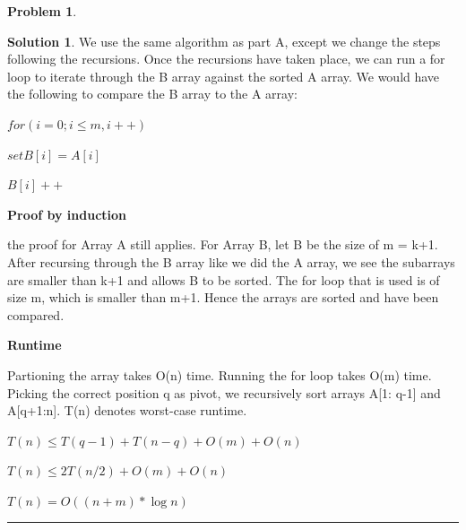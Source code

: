 \documentclass{article}
\theoremstyle{definition}
\newtheorem{problem}{Problem}
\def\fline{\rule{0.75\linewidth}{0.5pt}}
\newcommand{\finishline}{\begin{center}\fline\end{center}}
\newtheorem*{solution*}{Solution}
\newenvironment{solution}{\begin{solution*}}{{\finishline} \end{solution*}}
\begin{document}
\begin{problem}
\begin{enumerate}
    
    		    \begin{solution}
	\item We use the same algorithm as part A, except we change the steps following the recursions. Once the recursions have taken place, we can run a for loop to iterate through the B array against the sorted A array. We would have the following to compare the B array to the A array:
	\item $for (i = 0; i \leq m, i++) $
	\item \quad $set B[i] = A[i] $
	\item \quad $B[i]++$

	\item \textbf{Proof by induction}
	\item the proof for Array A still applies. For Array B, let B be the size of m = k+1. After recursing through the B array like we did the A array, we see the subarrays are smaller than k+1 and allows B to be sorted. The for loop that is used is of size m, which is smaller than m+1. Hence the arrays are sorted and have been compared.

\item \textbf{Runtime}
		\item Partioning the array takes O(n) time. Running the for loop takes O(m) time. Picking the correct position q as pivot, we recursively sort arrays A[1: q-1] and A[q+1:n]. T(n) denotes worst-case runtime.
 \begin{center}
	\item $T(n) \leq T(q-1) + T(n-q) +  O(m) + O(n)$
	\item $T(n) \leq 2T(n/2) + O(m) + O(n)$
	\item $T(n) = O((n+m) * \log n)$
\end{center}

\end{solution}

    
    \end{enumerate}
    
\end{problem}

\end{document}
